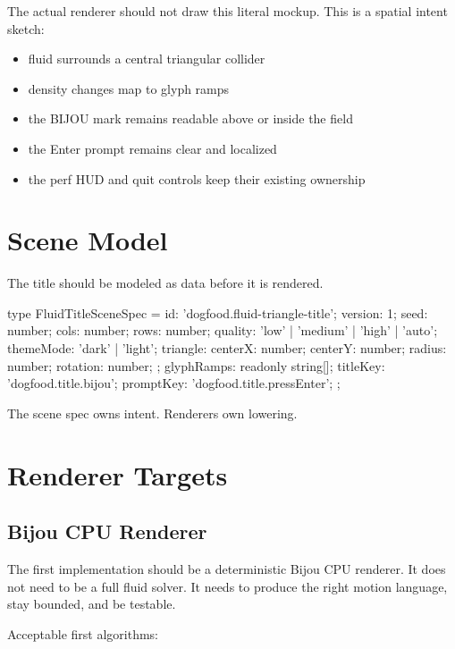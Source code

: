 The actual renderer should not draw this literal mockup. This is a spatial intent sketch:

\begin{itemize}
\tightlist
\item
  fluid surrounds a central triangular collider
\item
  density changes map to glyph ramps
\item
  the BIJOU mark remains readable above or inside the field
\item
  the Enter prompt remains clear and localized
\item
  the perf HUD and quit controls keep their existing ownership
\end{itemize}

\section{Scene Model}\label{record-114-scene-model}

The title should be modeled as data before it is rendered.

\begin{CodeBlock}
type FluidTitleSceneSpec = {
  id: 'dogfood.fluid-triangle-title';
  version: 1;
  seed: number;
  cols: number;
  rows: number;
  quality: 'low' | 'medium' | 'high' | 'auto';
  themeMode: 'dark' | 'light';
  triangle: {
    centerX: number;
    centerY: number;
    radius: number;
    rotation: number;
  };
  glyphRamps: readonly string[];
  titleKey: 'dogfood.title.bijou';
  promptKey: 'dogfood.title.pressEnter';
};
\end{CodeBlock}

The scene spec owns intent. Renderers own lowering.

\section{Renderer Targets}\label{record-114-renderer-targets}

\subsection{Bijou CPU Renderer}\label{record-114-bijou-cpu-renderer}

The first implementation should be a deterministic Bijou CPU renderer. It does not need to be a full fluid solver. It needs to produce the right motion language, stay bounded, and be testable.

Acceptable first algorithms:

